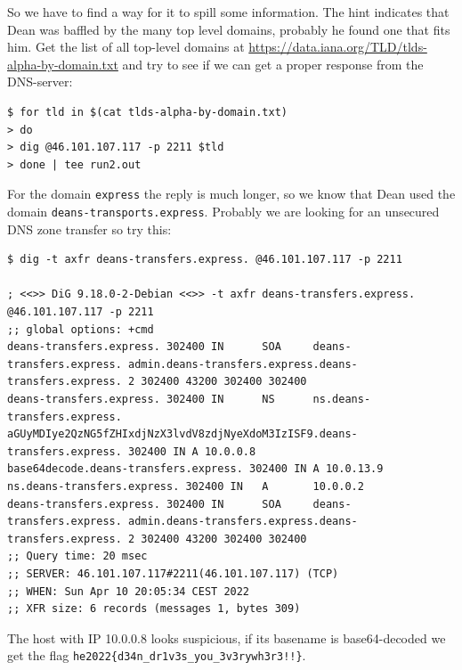 So we have to find a way for it to spill some information.  The hint indicates
that Dean was baffled by the many top level domains, probably he found one that
fits him.  Get the list of all top-level domains at
\url{https://data.iana.org/TLD/tlds-alpha-by-domain.txt} and try to see if we
can get a proper response from the DNS-server:

\begin{verbatim}
$ for tld in $(cat tlds-alpha-by-domain.txt)
> do
> dig @46.101.107.117 -p 2211 $tld
> done | tee run2.out
\end{verbatim}

For the domain \verb+express+ the reply is much longer, so we know that Dean
used the domain \verb+deans-transports.express+.  Probably we are looking for
an unsecured DNS zone transfer so try this:
\begin{fullwidth}
	{\footnotesize
\begin{verbatim}
$ dig -t axfr deans-transfers.express. @46.101.107.117 -p 2211

; <<>> DiG 9.18.0-2-Debian <<>> -t axfr deans-transfers.express. @46.101.107.117 -p 2211
;; global options: +cmd
deans-transfers.express. 302400 IN      SOA     deans-transfers.express. admin.deans-transfers.express.deans-transfers.express. 2 302400 43200 302400 302400
deans-transfers.express. 302400 IN      NS      ns.deans-transfers.express.
aGUyMDIye2QzNG5fZHIxdjNzX3lvdV8zdjNyeXdoM3IzISF9.deans-transfers.express. 302400 IN A 10.0.0.8
base64decode.deans-transfers.express. 302400 IN A 10.0.13.9
ns.deans-transfers.express. 302400 IN   A       10.0.0.2
deans-transfers.express. 302400 IN      SOA     deans-transfers.express. admin.deans-transfers.express.deans-transfers.express. 2 302400 43200 302400 302400
;; Query time: 20 msec
;; SERVER: 46.101.107.117#2211(46.101.107.117) (TCP)
;; WHEN: Sun Apr 10 20:05:34 CEST 2022
;; XFR size: 6 records (messages 1, bytes 309)
\end{verbatim}
}
\end{fullwidth}

The host with IP 10.0.0.8 looks suspicious, if its basename is base64-decoded we get the flag
\verb+he2022{d34n_dr1v3s_you_3v3rywh3r3!!}+.




